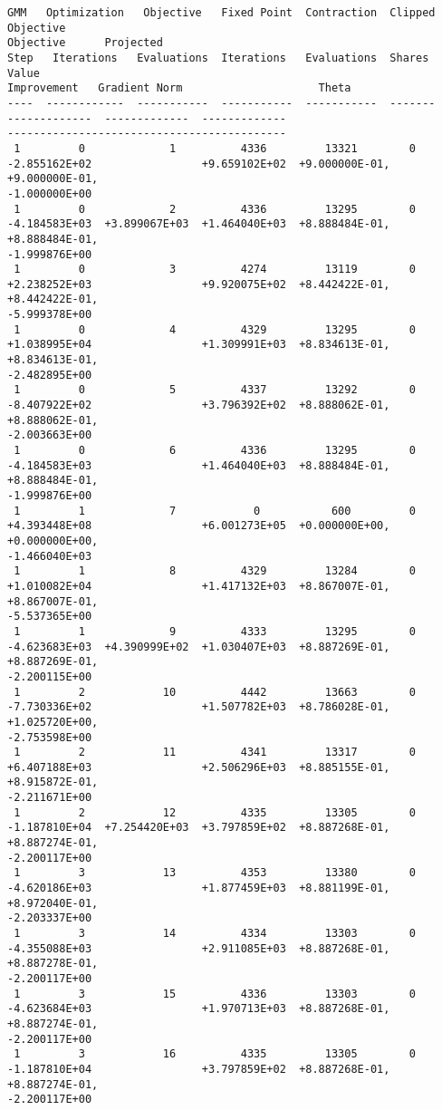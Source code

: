 \begin{Verbatim}[commandchars=\\\{\}]
GMM   Optimization   Objective   Fixed Point  Contraction  Clipped    Objective
Objective      Projected
Step   Iterations   Evaluations  Iterations   Evaluations  Shares       Value
Improvement   Gradient Norm                     Theta
----  ------------  -----------  -----------  -----------  -------
-------------  -------------  -------------
-------------------------------------------
 1         0             1          4336         13321        0
-2.855162E+02                 +9.659102E+02  +9.000000E-01, +9.000000E-01,
-1.000000E+00
 1         0             2          4336         13295        0
-4.184583E+03  +3.899067E+03  +1.464040E+03  +8.888484E-01, +8.888484E-01,
-1.999876E+00
 1         0             3          4274         13119        0
+2.238252E+03                 +9.920075E+02  +8.442422E-01, +8.442422E-01,
-5.999378E+00
 1         0             4          4329         13295        0
+1.038995E+04                 +1.309991E+03  +8.834613E-01, +8.834613E-01,
-2.482895E+00
 1         0             5          4337         13292        0
-8.407922E+02                 +3.796392E+02  +8.888062E-01, +8.888062E-01,
-2.003663E+00
 1         0             6          4336         13295        0
-4.184583E+03                 +1.464040E+03  +8.888484E-01, +8.888484E-01,
-1.999876E+00
 1         1             7            0           600         0
+4.393448E+08                 +6.001273E+05  +0.000000E+00, +0.000000E+00,
-1.466040E+03
 1         1             8          4329         13284        0
+1.010082E+04                 +1.417132E+03  +8.867007E-01, +8.867007E-01,
-5.537365E+00
 1         1             9          4333         13295        0
-4.623683E+03  +4.390999E+02  +1.030407E+03  +8.887269E-01, +8.887269E-01,
-2.200115E+00
 1         2            10          4442         13663        0
-7.730336E+02                 +1.507782E+03  +8.786028E-01, +1.025720E+00,
-2.753598E+00
 1         2            11          4341         13317        0
+6.407188E+03                 +2.506296E+03  +8.885155E-01, +8.915872E-01,
-2.211671E+00
 1         2            12          4335         13305        0
-1.187810E+04  +7.254420E+03  +3.797859E+02  +8.887268E-01, +8.887274E-01,
-2.200117E+00
 1         3            13          4353         13380        0
-4.620186E+03                 +1.877459E+03  +8.881199E-01, +8.972040E-01,
-2.203337E+00
 1         3            14          4334         13303        0
-4.355088E+03                 +2.911085E+03  +8.887268E-01, +8.887278E-01,
-2.200117E+00
 1         3            15          4336         13303        0
-4.623684E+03                 +1.970713E+03  +8.887268E-01, +8.887274E-01,
-2.200117E+00
 1         3            16          4335         13305        0
-1.187810E+04                 +3.797859E+02  +8.887268E-01, +8.887274E-01,
-2.200117E+00


\end{Verbatim}
